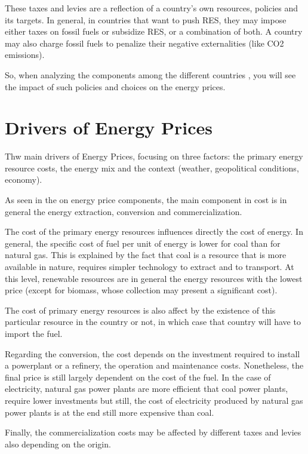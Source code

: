 \documentclass[]{book}
\theoremstyle{definition}
\theoremstyle{definition}
\theoremstyle{definition}
\theoremstyle{remark}
\begin{document}
These taxes and levies are a reflection of a country's own resources,
policies and its targets. In general, in countries that want to push
RES, they may impose either taxes on fossil fuels or subsidize RES, or a
combination of both. A country may also charge fossil fuels to penalize
their negative externalities (like CO2 emissions).

So, when analyzing the components among the different countries , you
will see the impact of such policies and choices on the energy prices.

\section{Drivers of Energy Prices}\label{drivers-of-energy-prices}

Thw main drivers of Energy Prices, focusing on three factors: the
primary energy resource costs, the energy mix and the context (weather,
geopolitical conditions, economy).

As seen in the on energy price components, the main component in cost is
in general the energy extraction, conversion and commercialization.

The cost of the primary energy resources influences directly the cost of
energy. In general, the specific cost of fuel per unit of energy is
lower for coal than for natural gas. This is explained by the fact that
coal is a resource that is more available in nature, requires simpler
technology to extract and to transport. At this level, renewable
resources are in general the energy resources with the lowest price
(except for biomass, whose collection may present a significant cost).

The cost of primary energy resources is also affect by the existence of
this particular resource in the country or not, in which case that
country will have to import the fuel.

Regarding the conversion, the cost depends on the investment required to
install a powerplant or a refinery, the operation and maintenance costs.
Nonetheless, the final price is still largely dependent on the cost of
the fuel. In the case of electricity, natural gas power plants are more
efficient that coal power plants, require lower investments but still,
the cost of electricity produced by natural gas power plants is at the
end still more expensive than coal.

Finally, the commercialization costs may be affected by different taxes
and levies also depending on the origin.
\end{document}
